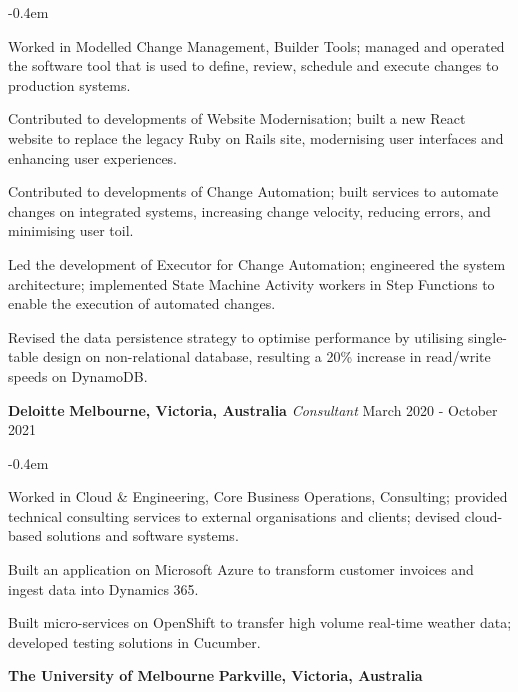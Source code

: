 \documentclass{cv}
\begin{document}
\begin{list}{}{\setlength{\leftmargin}{0em}}
\begin{list}{\raisebox{0.2em}{\tiny$\bullet$} \hspace{0em}}{\setlength{\leftmargin}{2.0em}}
        \itemsep -0.4em \vspace{-0.4em}
        \item Worked in Modelled Change Management, Builder Tools; managed and operated the software tool that is used to define, review, schedule and execute changes to production systems.
        \item Contributed to developments of Website Modernisation; built a new React website to replace the legacy Ruby on Rails site, modernising user interfaces and enhancing user experiences.
        \item Contributed to developments of Change Automation; built services to automate changes on integrated systems, increasing change velocity, reducing errors, and minimising user toil.
        \item Led the development of Executor for Change Automation; engineered the system architecture; implemented State Machine Activity workers in Step Functions to enable the execution of automated changes.
        \item Revised the data persistence strategy to optimise performance by utilising single-table design on non-relational database, resulting a 20\% increase in read/write speeds on DynamoDB.
    \end{list}
\item
    \textbf{Deloitte} \hfill \textbf{Melbourne, Victoria, Australia}%
    \vspace{0.1em} \newline 
    {\textit{Consultant}} \hfill {March 2020 - October 2021}%
    \begin{list}{\raisebox{0.2em}{\tiny$\bullet$} \hspace{0em}}{\setlength{\leftmargin}{2.0em}}
        \itemsep -0.4em \vspace{-0.4em}
        \item Worked in Cloud \& Engineering, Core Business Operations, Consulting; provided technical consulting services to external organisations and clients; devised cloud-based solutions and software systems.
        \item Built an application on Microsoft Azure to transform customer invoices and ingest data into Dynamics 365.
        \item Built micro-services on OpenShift to transfer high volume real-time weather data; developed testing solutions in Cucumber.
    \end{list}
\item
    \textbf{The University of Melbourne} \hfill \textbf{Parkville, Victoria, Australia}%

\end{list}
\end{document}
